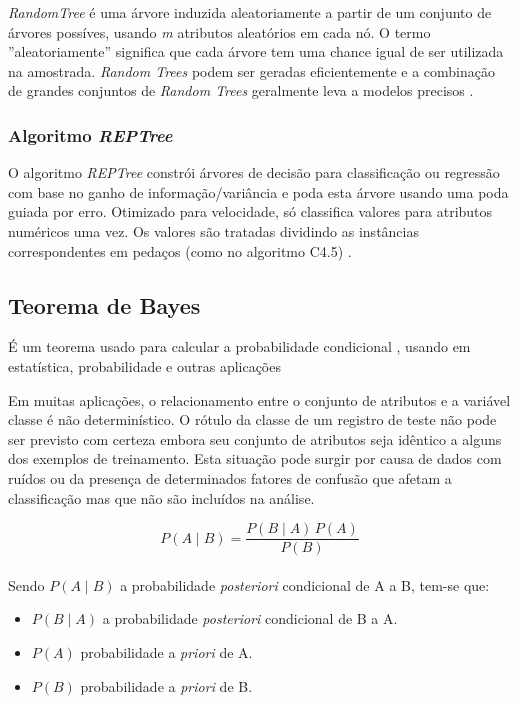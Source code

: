 \documentclass[
	12pt,				%
	openright,			%
	oneside,	
	a4paper,				%
	english,				%
	brazil				%
]{abntex2/abntex2} %
\begin{document}
	\textit{RandomTree} é uma árvore induzida aleatoriamente a partir de um conjunto de árvores possíves, usando \textit{m} atributos aleatórios em cada nó. O termo ''aleatoriamente'' significa que cada árvore tem uma chance igual de ser utilizada na amostrada. \textit{Random Trees} podem ser geradas eficientemente e a combinação de grandes conjuntos de \textit{Random Trees} geralmente leva a modelos precisos \cite{zhao:2008}.
	\vspace{-1.5\baselineskip}
	\subsubsection{Algoritmo \textit{REPTree}}
	\vspace{1\baselineskip}
	O algoritmo \textit{REPTree} constrói árvores de decisão para classificação ou regressão  com base no ganho de informação/variância e poda esta árvore usando uma poda guiada por erro. Otimizado para velocidade, só classifica valores para atributos numéricos uma vez. Os valores são tratadas dividindo as instâncias correspondentes em pedaços (como no algoritmo C4.5) \cite{witten:2011}.
	\vspace{-1.5\baselineskip}		
	\subsection{Teorema de Bayes}
	\vspace{1\baselineskip}
	É um teorema usado para calcular a probabilidade condicional , usando em estatística, probabilidade e outras aplicações
	
	Em muitas aplicações, o relacionamento entre o conjunto de atributos e a variável classe é não determinístico. O rótulo da classe de um registro de teste não pode ser previsto com certeza embora seu conjunto de atributos seja idêntico a alguns dos exemplos de treinamento. Esta situação pode surgir por causa de dados com ruídos ou da presença de determinados fatores de confusão que afetam a classificação mas que não são incluídos na análise.
	
	\begin{equation}
		 P(A \mid B) = \frac{P(B \mid A) \, P(A)}{P(B)} 
	\end{equation}
	\\
	Sendo $ P(A\mid B) $ a probabilidade \textit{posteriori} condicional de A a B, tem-se que:
	\begin{itemize}
		\item $P(B \mid A) $ a probabilidade \textit{posteriori} condicional de B a A.
		\item $P(A)$ probabilidade a \textit{priori} de A.
		\item $P(B )$ probabilidade a \textit{priori} de B.
	\end{itemize}
	\vspace{-1.5\baselineskip}
\end{document}
